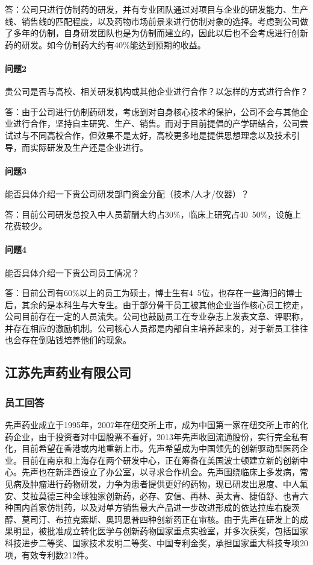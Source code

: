 \documentclass[twocolumn]{ctexbook}
\begin{document}
	答：公司只进行仿制药的研发，并有专业团队通过对项目与企业的研发能力、生产线、销售线的匹配程度，以及药物市场前景来进行仿制对象的选择。考虑到公司做了多年的仿制，自身研发团队也是为仿制而建立的，因此以后也不会考虑进行创新药的研发。如今仿制药大约有40\%能达到预期的收益。
	
	\paragraph{问题2}贵公司是否与高校、相关研发机构或其他企业进行合作？以怎样的方式进行合作？
	
	答：由于公司进行仿制药研发，考虑到对自身核心技术的保护，公司不会与其他企业进行合作，坚持自主研究、生产、销售。而对于目前提倡的产学研结合，公司尝试过与不同高校合作，但效果不是太好，高校更多地是提供思想理念以及技术引导，而实际研发及生产还是企业进行。
	
	\paragraph{问题3}能否具体介绍一下贵公司研发部门资金分配（技术/人才/仪器）？
	
	答：目前公司研发总投入中人员薪酬大约占30\%，临床上研究占40~50\%，设施上花费较少。
	
	\paragraph{问题4}能否具体介绍一下贵公司员工情况？
	
	答：目前公司有60\%以上的员工为硕士，博士生有4~5位，也存在一些海归的博士后，其余的是本科生与大专生。由于部分骨干员工被其他企业当作核心员工挖走，公司目前存在一定的人员流失。公司也鼓励员工在专业杂志上发表文章、评职称，并存在相应的激励机制。公司核心人员都是内部自主培养起来的，对于新员工往往也会存在倒贴钱培养他们的现象。

	\subsection*{江苏先声药业有限公司}
	\subsubsection*{员工回答}先声药业成立于1995年，2007年在纽交所上市，成为中国第一家在纽交所上市的化药企业，由于投资者对中国股票不看好，2013年先声收回流通股份，实行完全私有化，目前希望在香港或内地重新上市。先声希望成为中国领先的创新驱动型医药企业。目前在南京和上海存在两个研发中心，正在筹备在美国波士顿建立新的创新中心。先声也在新泽西设立了办公室，以寻求合作机会。先声围绕临床上多发病，常见病及肿瘤进行药物研发，力争为患者提供更好的药物，现已研发出恩度、中人氟安、艾拉莫德三种全球独家创新药，必存、安信、再林、英太青、捷佰舒、也青六种国内首家仿制药，以及对单方销售最大产品进一步改进形成的依达拉库右旋茨醇、莫司汀、布拉克索斯、奥玛思普四种创新药正在审核。由于先声在研发上的成果明显，被批准成立转化医学与创新药物国家重点实验室，并多次获奖，包括国家科技进步二等奖、国家技术发明二等奖、中国专利金奖，承担国家重大科技专项20项，有效专利数212件。
	
\end{document}

